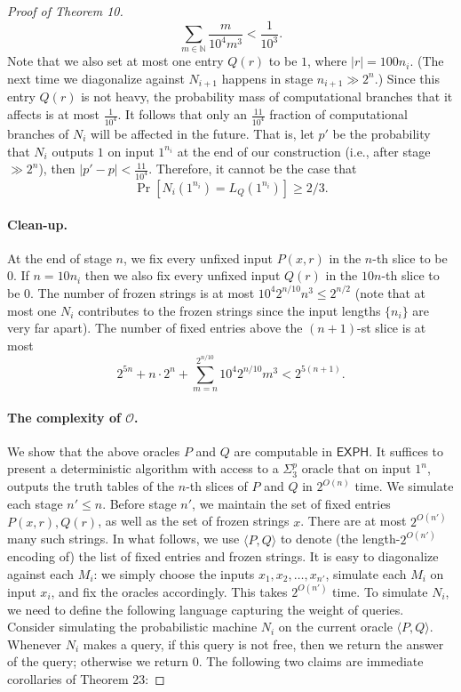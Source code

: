 \documentclass[10pt,a4paper]{article}
\begin{document}
\begin{proof}[Proof of Theorem 10]
\[\sum_{m\in\mathbb N}\frac{m}{10^4m^3}<\frac{1}{10^3}.\]
Note that we also set at most one entry $Q(r)$ to be $1$, where $|r|=100n_i$. (The next time we diagonalize against $N_{i+1}$ happens in stage $n_{i+1}\gg2^n$.) Since this entry $Q(r)$ is not heavy, the probability mass of computational branches that it affects is at most $\frac{1}{10^4}$.
It follows that only an $\frac{11}{10^4}$ fraction of computational branches of $N_i$ will be affected in the future. That is, let $p'$ be the probability that $N_i$ outputs $1$ on input $1^{n_i}$ at the end of our construction (i.e., after stage $\gg2^n$), then $|p'-p|<\frac{11}{10^4}$. Therefore, it cannot be the case that
\[\Pr[N_i(1^{n_i})=L_Q(1^{n_i})]\geq2/3.\]
\paragraph{Clean-up.}
At the end of stage $n$, we fix every unfixed input $P(x,r)$ in the $n$-th slice to be $0$. If $n=10n_i$ then we also fix every unfixed input $Q(r)$ in the $10n$-th slice to be $0$. The number of frozen strings is at most $10^4 2^{n/10}n^3\leq2^{n/2}$ (note that at most one $N_i$ contributes to the frozen strings since the input lengths $\{n_i\}$ are very far apart). The number of fixed entries above the $(n+1)$-st slice is at most
\[2^{5n}+n\cdot2^n+\sum_{m=n}^{2^{n/10}}10^4 2^{n/10}m^3<2^{5(n+1)}.\]
\paragraph{The complexity of $\mathcal O$.}
We show that the above oracles $P$ and $Q$ are computable in $\mathsf{EXPH}$. It suffices to present a deterministic algorithm with access to a $\Sigma^p_3$ oracle that on input $1^n$, outputs the truth tables of the $n$-th slices of $P$ and $Q$ in $2^{O(n)}$ time.
We simulate each stage $n'\leq n$. Before stage $n'$, we maintain the set of fixed entries $P(x,r),Q(r)$, as well as the set of frozen strings $x$. There are at most $2^{O(n')}$ many such strings. In what follows, we use $\langle P,Q\rangle$ to denote (the length-$2^{O(n')}$ encoding of) the list of fixed entries and frozen strings.
It is easy to diagonalize against each $M_i$: we simply choose the inputs $x_1,x_2,\ldots,x_{n'}$, simulate each $M_i$ on input $x_i$, and fix the oracles accordingly. This takes $2^{O(n')}$ time.
To simulate $N_i$, we need to define the following language capturing the weight of queries. Consider simulating the probabilistic machine $N_i$ on the current oracle $\langle P,Q\rangle$. Whenever $N_i$ makes a query, if this query is not free, then we return the answer of the query; otherwise we return $0$. The following two claims are immediate corollaries of Theorem 23:

\end{proof}
\end{document}
